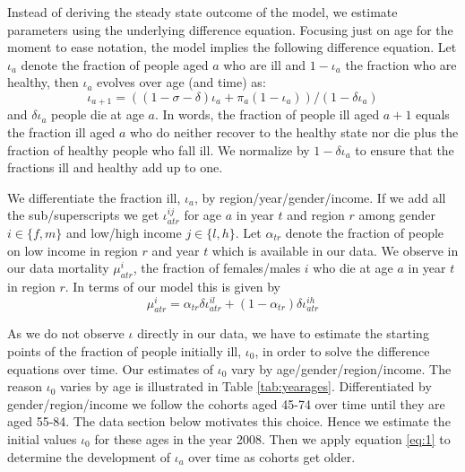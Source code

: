 \documentclass[a4paper,12pt]{article}
\begin{document}
Instead of deriving the steady state outcome of the model, we estimate parameters using the underlying difference equation. Focusing just on age for the moment to ease notation, the model implies the following difference equation. Let \(\iota_a\) denote the fraction of people aged \(a\) who are ill and \(1-\iota_a\) the fraction who are healthy, then \(\iota_a\) evolves over age (and time) as:
\begin{equation}
\label{eq:1}
\iota_{a+1} = ((1-\sigma-\delta) \iota_a + \pi_a (1-\iota_a))/(1-\delta \iota_{a})
\end{equation}
and \(\delta \iota_a\) people die at age \(a\). In words, the fraction of people ill aged \(a+1\) equals the fraction ill aged \(a\) who do neither recover to the healthy state nor die plus the fraction of healthy people who fall ill. We normalize by \(1-\delta \iota_a\) to ensure that the fractions ill and healthy add up to one.

We differentiate the fraction ill, \(\iota_a\), by region/year/gender/income. If we add all the sub/superscripts we get \(\iota_{atr}^{ij}\) for age \(a\) in year \(t\) and region \(r\) among gender \(i \in \{f,m\}\) and low/high income \(j \in \{l,h\}\). Let \(\alpha_{tr}\) denote the fraction of people on low income in region \(r\) and year \(t\) which is available in our data. We observe in our data mortality \(\mu_{atr}^{i}\), the fraction of females/males \(i\) who die at age \(a\) in year \(t\) in region \(r\). In terms of our model this is given by
\begin{equation}
\label{eq:2}
\mu_{atr}^i = \alpha_{tr} \delta \iota_{atr}^{il} + (1-\alpha_{tr}) \delta \iota_{atr}^{ih}
\end{equation}

As we do not observe \(\iota\) directly in our data, we have to estimate the starting points of the fraction of people initially ill, \(\iota_0\), in order to solve the difference equations over time. Our estimates of \(\iota_0\) vary by age/gender/region/income. The reason \(\iota_0\) varies by age is illustrated in Table \ref{tab:yearages}. Differentiated by gender/region/income we follow the cohorts aged 45-74 over time until they are aged 55-84. The data section below motivates this choice. Hence we estimate the initial values \(\iota_0\) for these ages in the year 2008. Then we apply equation \eqref{eq:1} to determine the development of \(\iota_a\) over time as cohorts get older.
\end{document}
